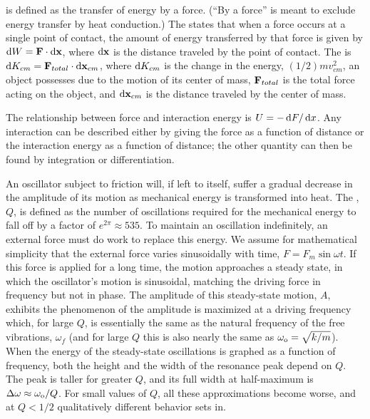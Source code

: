	
	 is defined as the transfer of energy by a force. (``By a force'' is meant
	to exclude energy transfer by heat conduction.) The  states that
	when a force occurs at a single point of contact, the amount of energy transferred
	by that force is given by $\operatorname{d\!} W=\mathbf{F}\cdot\operatorname{d\!}\mathbf{x}$, where $\operatorname{d\!}\mathbf{x}$ is
	the distance traveled by the point of contact. The  is $\operatorname{d\!} K_{cm}=\mathbf{F}_{total}\cdot\operatorname{d\!}\mathbf{x}_{cm}$, where
	$\operatorname{d\!} K_{cm}$ is the change in the energy, $(1/2)mv_{cm}^2$, an object possesses due to the motion of
	its center of mass, $\mathbf{F}_{total}$ is the total force acting on the object,
	and $\operatorname{d\!}\mathbf{x}_{cm}$ is the distance traveled by the center of mass.
	
	The relationship between force and interaction energy is $U=-\operatorname{d\!} F/\operatorname{d\!} x$.
	Any interaction can be described either by giving the force as a function of
	distance or the interaction energy as a function of distance; the other quantity
	can then be found by integration or differentiation.
	
	An oscillator subject to friction will, if left to itself, suffer a gradual
	decrease in the amplitude of its motion as mechanical energy is transformed
	into heat. The , $Q$, is defined as the number of
	oscillations required for the mechanical energy to fall off by a factor of
	$e^{2\pi}\approx535$.
	To maintain an oscillation indefinitely, an external force must
	do work to replace this energy. We assume for mathematical simplicity that the
	external force varies sinusoidally with time, $F=F_m\sin\omega t$.
	If this force is applied for a long time, the motion approaches a steady
	state, in which the oscillator's motion is sinusoidal, matching the
	driving force in frequency but not in phase. The amplitude of this
	steady-state motion, $A$, exhibits the phenomenon of 
	the amplitude is maximized at a driving frequency which, for large $Q$, is essentially the
	same as the natural frequency of the free vibrations, $\omega_f$ (and
	for large $Q$ this is also nearly the same as $\omega_{\textup{o}}=\sqrt{k/m}$).
	When the energy of the steady-state oscillations is graphed as a function
	of frequency, both the height and the width of the resonance peak depend
	on $Q$. The peak is taller for greater $Q$, and its
	 full width at half-maximum is
	$\Delta\omega\approx\omega_{\textup{o}}/Q$. For small values of $Q$, all these
	approximations become worse, and at $Q<1/2$ qualitatively different behavior
	sets in.
	
